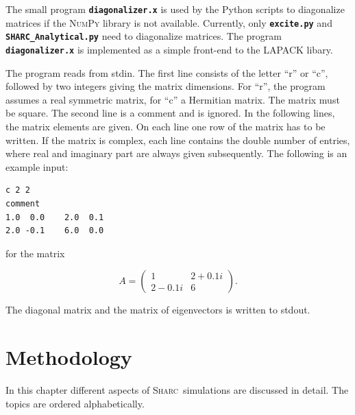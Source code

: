 \documentclass[a4paper,11pt,DIV=15,openany,twoside=false]{scrbook}
\newcommand{\tthdump}[1]{#1}
\newcommand{\sharc}{\textsc{Sharc}}
\newcommand{\ttt}[1]{\textbf{\texttt{#1}}}
\newenvironment{example}{
  \vspace{0mm}
  \definecolor{shadecolor}{HTML}{E4F4FF}
  \begin{shaded}
}{
  \end{shaded}
}
\begin{document}
The small program \ttt{diagonalizer.x} is used by the Python scripts to diagonalize matrices if the \textsc{NumPy} library is not available. Currently, only \ttt{excite.py} and \ttt{SHARC\_Analytical.py} need to diagonalize matrices. The program \ttt{diagonalizer.x} is implemented as a simple front-end to the LAPACK libary.

The program reads from stdin. The first line consists of the letter ``r'' or ``c'', followed by two integers giving the matrix dimensions. For ``r'', the program assumes a real symmetric matrix, for ``c'' a Hermitian matrix. The matrix must be square.
The second line is a comment and is ignored.
In the following lines, the matrix elements are given. On each line one row of the matrix has to be written. If the matrix is complex, each line contains the double number of entries, where real and imaginary part are always given subsequently.
The following is an example input:
\begin{example}
\footnotesize\begin{verbatim}
c 2 2
comment
1.0  0.0    2.0  0.1
2.0 -0.1    6.0  0.0
\end{verbatim}
\end{example}

\normalsize
for the matrix 
\tthdump{
  \begin{equation}
    A=\begin{pmatrix}
        1 &2+0.1i\\
        2-0.1i&6
      \end{pmatrix}.\nonumber
  \end{equation}
}
The diagonal matrix and the matrix of eigenvectors is written to stdout.




\chapter{Methodology}

In this chapter different aspects of \sharc\ simulations are discussed in detail. The topics are ordered alphabetically.
\end{document}
